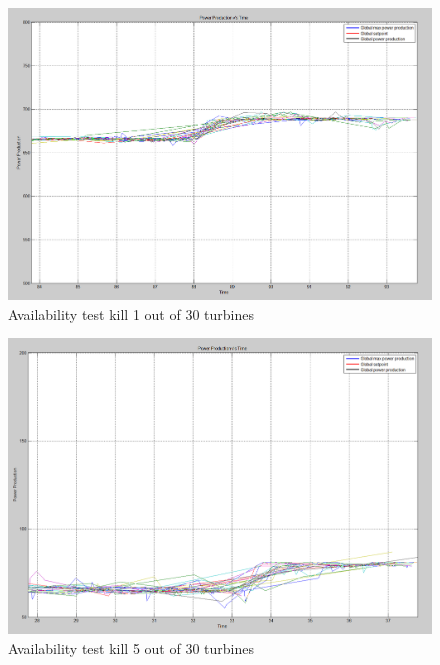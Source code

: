 \begin{figure}
	\centering
	\includegraphics[width=\resultsFigureWidthScale\textwidth]{figures/Results/availabilitytest30-29_setpoint_20000.PNG}
	\caption{Availability test kill 1 out of 30 turbines}
	\label{fig:exp:availability_kill1}
\end{figure}

\begin{figure}
	\centering
	\includegraphics[width=\resultsFigureWidthScale\textwidth]{figures/Results/availabilitytest30-25_setpoint_2000.PNG}
	\caption{Availability test kill 5 out of 30 turbines}
	\label{fig:exp:availability_kill5}
\end{figure}

